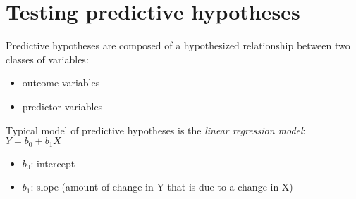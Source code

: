 \documentclass[11pt]{article}
\begin{document}
\section*{Testing predictive hypotheses}
\label{sec-3}

Predictive hypotheses are composed of a hypothesized relationship between two classes of variables:
\begin{itemize}
\item outcome variables
\item predictor variables
\end{itemize}

Typical model of predictive hypotheses is the \emph{linear regression model}: $Y=b_0+b_1X$
\begin{itemize}
\item $b_0$: intercept
\item $b_1$: slope (amount of change in Y that is due to a change in X)
\end{itemize}
\end{document}

